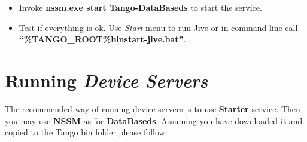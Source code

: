 \documentclass[letterpaper,10pt,english]{sphinxmanual}
\begin{document}
\begin{itemize}
\begin{description}
\begin{itemize}
\begin{description}
\end{description}

\item {} 
Invoke \textbf{nssm.exe start Tango-DataBaseds} to start the service.

\item {} 
Test if everything is ok. Use \emph{Start} menu to run Jive or in command line call
\textbf{``\%TANGO\_ROOT\%binstart-jive.bat''}.

\end{itemize}

\end{description}

\end{itemize}


\section{Running \emph{Device Servers}}
\label{tango-on-windows:running-device-servers}
The recommended way of running device servers is to use \textbf{Starter} service. Then you may use
\textbf{NSSM} as for \textbf{DataBaseds}.
Assuming you have downloaded it and copied to the Tango bin folder please follow:
\end{document}

